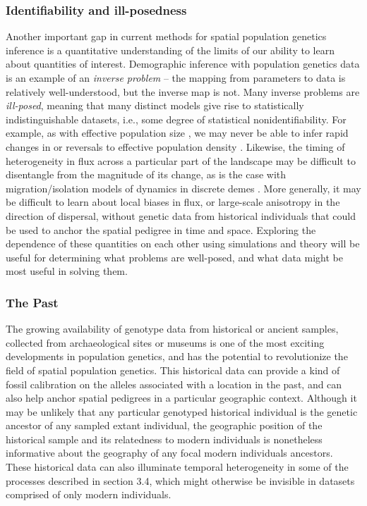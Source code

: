 \documentclass{ar-1col}
\newcommand{\todo}[1]{{\textbf{\color{red}{#1}}}}
\renewcommand{\emph}[1]{{\textit{#1}}}
\begin{document}
\subsubsection{Identifiability and ill-posedness}
\todo{keep?}

Another important gap in current methods for spatial population genetics inference 
is a quantitative understanding of the limits of our ability to learn about 
quantities of interest.
Demographic inference with population genetics data
is an example of an \emph{inverse problem} --
the mapping from parameters to data is relatively well-understood,
but the inverse map is not.
Many inverse problems are \emph{ill-posed},
meaning that many distinct models give rise to statistically indistinguishable datasets,
i.e., some degree of statistical nonidentifiability.
For example, 
as with effective population size \citep{Myers2008},
we may never be able to infer rapid changes in 
or reversals to effective population density
\citep[although see also][]{BhaskarSong2014descartes}.
Likewise, 
the timing of heterogeneity in flux across a particular part of the landscape 
may be difficult to disentangle from the magnitude of its change, 
as is the case with migration/isolation models 
of dynamics in discrete demes \citep{sousa2011nonidentifiability}.
More generally,
it may be difficult to learn about local biases in flux, 
or large-scale anisotropy in the direction of dispersal,
without genetic data from historical individuals 
that could be used to anchor the spatial pedigree 
in time and space.
Exploring the dependence of these quantities on each other 
using simulations and theory 
will be useful for determining what problems are well-posed, 
and what data might be most useful in solving them.


\subsubsection{The Past} 

The growing availability of genotype data from historical or ancient samples, 
collected from archaeological sites or museums 
is one of the most exciting developments in population genetics, 
and has the potential to revolutionize the field of spatial population genetics.
This historical data can provide a kind of fossil calibration on 
the alleles associated with a location in the past, 
and can also help anchor spatial pedigrees in a particular geographic context.
Although it may be unlikely that any particular genotyped historical individual 
is the genetic ancestor of any sampled extant individual, 
the geographic position of the historical sample and its 
relatedness to modern individuals is nonetheless informative 
about the geography of any focal modern individuals ancestors.
These historical data can also illuminate temporal heterogeneity 
in some of the processes described in section 3.4, 
which might otherwise be invisible in datasets comprised of only modern individuals.
\end{document}
